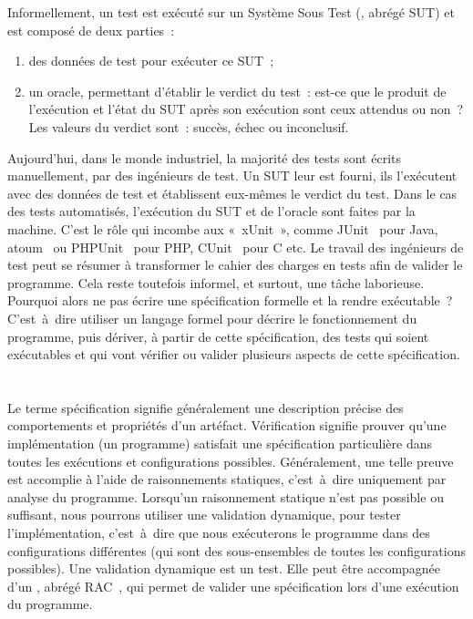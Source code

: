 Informellement, un test est exécuté sur un Système Sous Test (, abrégé {\strong SUT}) et est composé de deux parties~:
%
\begin{enumerate}

\item des {\strong données de test} pour exécuter ce SUT~;

\item un {\strong oracle}, permettant d'établir le verdict du test~: est-ce que
le produit de l'exécution et l'état du SUT après son exécution sont ceux
attendus ou non~? Les valeurs du verdict sont~: succès, échec ou inconclusif.

\end{enumerate}

Aujourd'hui, dans le monde industriel, la majorité des tests sont écrits
{\strong manuellement}, par des ingénieurs de test. Un SUT leur est fourni, ils
l'exécutent avec des données de test et établissent eux-mêmes le verdict du
test. Dans le cas des tests {\strong automatisés}, l'exécution du SUT et de
l'oracle sont faites par la machine. C'est le rôle qui incombe aux
 «~xUnit~», comme JUnit~ pour Java,
atoum~ ou PHPUnit~ pour PHP, CUnit~
pour C etc. Le travail des ingénieurs de test peut se résumer à transformer le
cahier des charges en tests afin de valider le programme. Cela reste toutefois
informel, et surtout, une tâche laborieuse. Pourquoi alors ne pas écrire une
spécification formelle et la rendre exécutable~? C'est~à~dire utiliser un
langage formel pour décrire le fonctionnement du programme, puis dériver, à
partir de cette spécification, des tests qui soient exécutables et qui vont
vérifier ou valider plusieurs aspects de cette spécification.

\section{}

Le terme {\strong spécification} signifie généralement une description précise
des comportements et propriétés d'un artéfact. {\strong Vérification} signifie
prouver qu'une implémentation (un programme) satisfait une spécification
particulière dans toutes les exécutions et configurations possibles.
Généralement, une telle preuve est accomplie à l'aide de raisonnements
statiques, c'est~à~dire uniquement par analyse du programme. Lorsqu'un
raisonnement statique n'est pas possible ou suffisant, nous pourrons utiliser
une {\strong validation} dynamique, pour tester l'implémentation, c'est~à~dire
que nous exécuterons le programme dans des configurations différentes (qui sont
des sous-ensembles de toutes les configurations possibles). Une validation
dynamique est un test. Elle peut être accompagnée d'un , abrégé RAC~, qui permet de valider une
spécification lors d'une exécution du programme.

